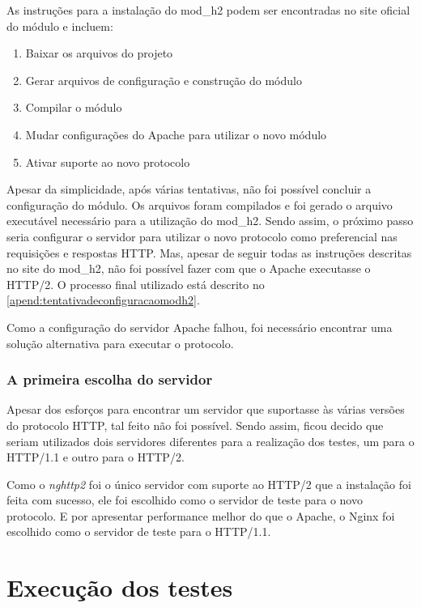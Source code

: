 As instruções para a instalação do mod\_h2 podem ser encontradas no site oficial do módulo e incluem:
\begin{enumerate}
	\item Baixar os arquivos do projeto
	\item Gerar arquivos de configuração e construção do módulo
	\item Compilar o módulo
	\item Mudar configurações do Apache para utilizar o novo módulo
	\item Ativar suporte ao novo protocolo
\end{enumerate}

Apesar da simplicidade, após várias tentativas, não foi possível concluir a configuração do módulo. Os arquivos foram compilados e foi gerado o arquivo executável necessário para a utilização do mod\_h2. Sendo assim, o próximo passo seria configurar o servidor para utilizar o novo protocolo como preferencial nas requisições e respostas HTTP. Mas, apesar de seguir todas as instruções descritas no site do mod\_h2, não foi possível fazer com que o Apache executasse o HTTP/2. O processo final utilizado está descrito no \autoref{apend:tentativadeconfiguracaomodh2}.

Como a configuração do servidor Apache falhou, foi necessário encontrar uma solução alternativa para executar o protocolo.

\subsubsection{A primeira escolha do servidor}
\label{aprimeiraescolhadoservidor}

Apesar dos esforços para encontrar um servidor que suportasse às várias versões do protocolo HTTP, tal feito não foi possível. Sendo assim, ficou decido que seriam utilizados dois servidores diferentes para a realização dos testes, um para o HTTP/1.1 e outro para o HTTP/2.

Como o \textit{nghttp2} foi o único servidor com suporte ao HTTP/2 que a instalação foi feita com sucesso, ele foi escolhido como o servidor de teste para o novo protocolo. E por apresentar performance melhor do que o Apache, o Nginx foi escolhido como o servidor de teste para o HTTP/1.1.


\section{Execução dos testes}
\label{execuçãodostestes}

